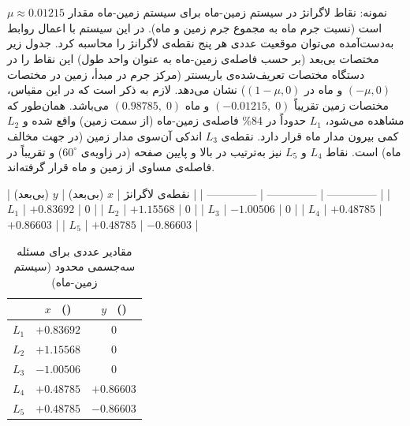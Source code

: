 \section{} نمونه: نقاط لاگرانژ در سیستم زمین-ماه  
برای سیستم زمین-ماه مقدار $\mu \approx 0.01215$ است (نسبت جرم ماه به مجموع جرم زمین و ماه). در این سیستم با اعمال روابط به‌دست‌آمده می‌توان موقعیت عددی هر پنج نقطه‌ی لاگرانژ را محاسبه کرد. جدول زیر مختصات بی‌بعد (بر حسب فاصله‌ی زمین-ماه به عنوان واحد طول) این نقاط را در دستگاه مختصات تعریف‌شده‌ی باریسنتر (مرکز جرم در مبدأ، زمین در مختصات $(-\mu,0)$ و ماه در $(1-\mu,0)$) نشان می‌دهد. لازم به ذکر است که در این مقیاس، مختصات زمین تقریباً $(-0.01215,\;0)$ و ماه $(0.98785,\;0)$ می‌باشد. همان‌طور که مشاهده می‌شود، $L_1$ حدوداً در 84\% فاصله‌ی زمین-ماه (از سمت زمین) واقع شده و $L_2$ کمی بیرون مدار ماه قرار دارد. نقطه‌ی $L_3$ اندکی آن‌سوی مدار زمین (در جهت مخالف ماه) است. نقاط $L_4$ و $L_5$ نیز به‌ترتیب در بالا و پایین صفحه (در زاویه‌ی $60^\circ$) و تقریباً در فاصله‌ی مساوی از زمین و ماه قرار گرفته‌اند.

| نقطه‌ی لاگرانژ | $x$ (بی‌بعد)     | $y$ (بی‌بعد)    |
| -------------- | -------------- | -------------- |
| $L_1$          | $+0.83692$     | $0$            |
| $L_2$          | $+1.15568$     | $0$            |
| $L_3$          | $-1.00506$     | $0$            |
| $L_4$          | $+0.48785$     | $+0.86603$     |
| $L_5$          | $+0.48785$     | $-0.86603$     |


\begin{table}[H]
	\centering
	\caption{مقادیر عددی برای مسئله سه‌جسمی محدود (سیستم زمین-ماه)}
\begin{tabular}{|c|c|c|}
	\hline
	\text{نقطه‌ی لاگرانژ} & \(x\) \, (\text{بی‌بعد}) & \(y\) \, (\text{بی‌بعد}) \\
	\hline
	$L_1$ & $+0.83692$ & $0$ \\
	$L_2$ & $+1.15568$ & $0$ \\
	$L_3$ & $-1.00506$ & $0$ \\
	$L_4$ &$ +0.48785$ & $+0.86603$ \\
	$L_5$ & $+0.48785$ & $-0.86603$ \\
	\hline  
\end{tabular}
\end{table}









